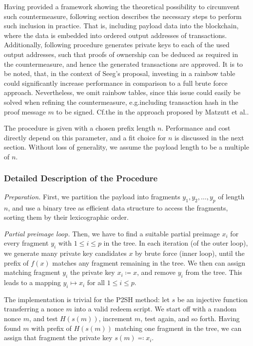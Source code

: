 \documentclass[a4paper,11pt,titlepage]{scrbook}
\begin{document}
Having provided a framework showing the theoretical possibility to circumvent such countermeasure, following section describes the necessary steps to perform such inclusion in practice.
That is, including payload data into the blockchain, where the data is embedded into ordered output addresses of transactions.
Additionally, following procedure generates private keys to each of the used output addresses, such that proofs of ownership can be deduced as required in the countermeasure, and hence the generated transactions are approved.
It is to be noted, that, in the context of Seeg's proposal, investing in a rainbow table could significantly increase performance in comparison to a full brute force approach.
Nevertheless, we omit rainbow tables, since this issue could easily be solved when refining the countermeasure, e.g.\@ including transaction hash in the proof message $m$ to be signed.
Cf.\@ the  in the approach proposed by Matzutt et al.\@ \cite[368--369]{matzutt_thwarting_2018}.

The procedure is given with a chosen prefix length $n$. Performance and cost directly depend on this parameter, and a fit choice for $n$ is discussed in the next section.
Without loss of generality, we assume the payload length to be a multiple of $n$.

\subsubsection*{Detailed Description of the Procedure}

\emph{Preparation.} First, we partition the payload into fragments $y_1, y_2, \dots, y_p$ of length $n$, and use a binary tree as efficient data structure to access the fragments, sorting them by their lexicographic order.

\emph{Partial preimage loop.} 
Then, we have to find a suitable partial preimage $x_i$ for every fragment $y_i$ with $1\leq i \leq p$ in the tree.
In each iteration (of the outer loop), we generate many private key candidates $x$ by brute force (inner loop), until the prefix of $f(x)$ matches any fragment remaining in the tree.
We then can assign matching fragment $y_i$ the private key $x_i \coloneqq x$, and remove $y_i$ from the tree.
This leads to a mapping $y_i \mapsto x_i$ for all $1\leq i\leq p$.

The implementation is trivial for the P2SH method: let $s$ be an injective function transferring a nonce $m$ into a valid redeem script.
We start off with a random nonce $m$, and test $H(s(m))$, increment $m$, test again, and so forth.
Having found $m$ with prefix of $H(s(m))$ matching one fragment in the tree, we can assign that fragment the private key $s(m)\eqqcolon x_i$.
\end{document}
